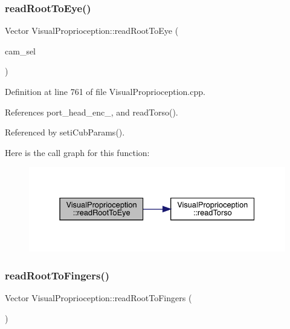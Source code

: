 \subsubsection{\texorpdfstring{read\+Root\+To\+Eye()}{readRootToEye()}}
{\footnotesize\ttfamily Vector Visual\+Proprioception\+::read\+Root\+To\+Eye (\begin{DoxyParamCaption}\item[{const yarp\+::os\+::\+Const\+String}]{cam\+\_\+sel }\end{DoxyParamCaption})\hspace{0.3cm}{\ttfamily [protected]}}



Definition at line 761 of file Visual\+Proprioception.\+cpp.



References port\+\_\+head\+\_\+enc\+\_\+, and read\+Torso().



Referenced by seti\+Cub\+Params().

Here is the call graph for this function\+:
\nopagebreak
\begin{figure}[H]
\begin{center}
\leavevmode
\includegraphics[width=331pt]{classVisualProprioception_aa0ce08aa7f8fa882ade6997a1c9297ad_cgraph}
\end{center}
\end{figure}
\mbox{\label{classVisualProprioception_af3370849532d77174f5848f415c08e9e}} 
\subsubsection{\texorpdfstring{read\+Root\+To\+Fingers()}{readRootToFingers()}}
{\footnotesize\ttfamily Vector Visual\+Proprioception\+::read\+Root\+To\+Fingers (\begin{DoxyParamCaption}{ }\end{DoxyParamCaption})\hspace{0.3cm}{\ttfamily [protected]}}



